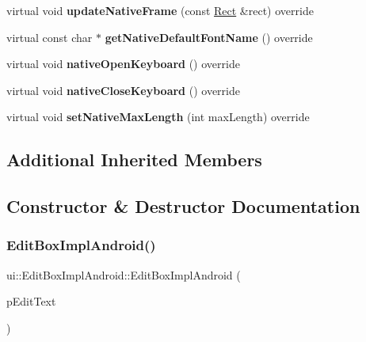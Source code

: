 \begin{DoxyCompactItemize}
virtual void {\bfseries update\+Native\+Frame} (const \hyperlink{classRect}{Rect} \&rect) override
\item 
\mbox{\label{classui_1_1EditBoxImplAndroid_a341faaffc5e30872cbf479cefeeeaca6}} 
virtual const char $\ast$ {\bfseries get\+Native\+Default\+Font\+Name} () override
\item 
\mbox{\label{classui_1_1EditBoxImplAndroid_aa6101dbfb8c9daf73769fc4af9e6fefb}} 
virtual void {\bfseries native\+Open\+Keyboard} () override
\item 
\mbox{\label{classui_1_1EditBoxImplAndroid_acd7029363fe3f37e07dede6792fe20e3}} 
virtual void {\bfseries native\+Close\+Keyboard} () override
\item 
\mbox{\label{classui_1_1EditBoxImplAndroid_a7a0c9d30c75009fbaa9d09fd8223f1d2}} 
virtual void {\bfseries set\+Native\+Max\+Length} (int max\+Length) override
\end{DoxyCompactItemize}
\subsection*{Additional Inherited Members}


\subsection{Constructor \& Destructor Documentation}
\mbox{\label{classui_1_1EditBoxImplAndroid_a793520aec53395d984275bf55896e1a0}} 
\subsubsection{\texorpdfstring{Edit\+Box\+Impl\+Android()}{EditBoxImplAndroid()}\hspace{0.1cm}{\footnotesize\ttfamily [1/2]}}
{\footnotesize\ttfamily ui\+::\+Edit\+Box\+Impl\+Android\+::\+Edit\+Box\+Impl\+Android (\begin{DoxyParamCaption}\item[{\hyperlink{classui_1_1EditBox}{Edit\+Box} $\ast$}]{p\+Edit\+Text }\end{DoxyParamCaption})}

